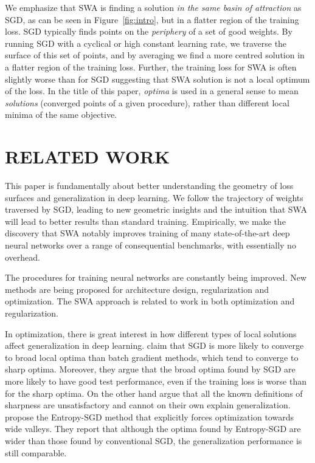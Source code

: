 \documentclass[letterpaper]{article}
\begin{document}
We emphasize that SWA is finding a solution \emph{in the same basin of attraction} as SGD,
as can be seen in Figure~\ref{fig:intro}, but in a flatter region of the training loss. 
SGD typically 
finds points on the \emph{periphery} of a set of good weights. By running SGD with a cyclical
or high constant learning rate, we traverse the surface of this set of points, and by averaging
we find a more centred solution in a flatter region of the training loss. 
Further, the training loss for SWA is often slightly worse than 
for SGD suggesting that SWA solution is not a local optimum of the loss.
In the title of this paper, \emph{optima} is used in a general sense to mean \emph{solutions} (converged
points of a given procedure), rather than different local minima of the same objective. 

\section{RELATED WORK}
\label{sec:related_work}

This paper is fundamentally about better understanding
the geometry of loss surfaces and generalization in deep
learning. We follow the trajectory of weights traversed by 
SGD, leading to new geometric insights and the intuition 
that SWA will lead to better results than standard training.
Empirically, we make the discovery that SWA notably improves 
training of many state-of-the-art deep neural networks over a range
of consequential benchmarks, with essentially no overhead.

The procedures for training neural networks are constantly being improved.
New methods are being proposed for architecture design, regularization and 
optimization. The SWA approach is related to work in both optimization and
regularization. 

In optimization, there is great interest in how different types of local solutions 
affect generalization in deep learning. \citet{keskar2017large} claim that 
SGD is more likely to converge to broad local optima than batch gradient
methods, which tend to converge to sharp optima.  Moreover, they argue 
that the broad optima found by SGD are more likely to have good test 
performance, even if the training loss is worse than for the sharp optima.
On the other hand \citet{dinh2017} argue that all the known
definitions of sharpness are unsatisfactory and cannot on their own explain 
generalization.
\citet{chaudhari2016} propose the Entropy-SGD method that
explicitly forces optimization towards wide valleys. They report that although the 
optima found by Entropy-SGD are wider than those found by conventional SGD, 
the generalization performance is still comparable.
\end{document}
